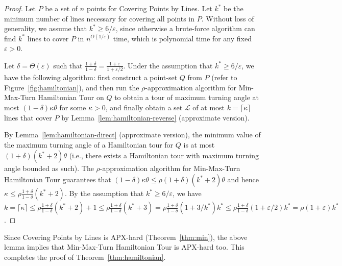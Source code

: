 \documentclass[letterpaper,11pt]{article}
\def\ie{{i.e.}}
\def\L{{\mathcal L}}
\newcommand{\eps}{\varepsilon}
\begin{document}
\begin{proof}
Let $P$ be a set of $n$ points for {\sc Covering Points by Lines}.
Let $k^*$ be the minimum number of lines
necessary for covering all points in $P$.
Without loss of generality, we assume that $k^* \ge 6/\eps$, since otherwise
a brute-force algorithm can find $k^*$ lines to cover $P$
in $n^{O(1/\eps)}$ time, which is polynomial time for any fixed $\eps > 0$.

Let $\delta = \Theta(\eps)$ such that
$\frac{1+\delta}{1-\delta} = \frac{1+\eps}{1+\eps/2}$.
Under the assumption that $k^* \ge 6/\eps$, we have the following algorithm:
first construct a point-set $Q$ from $P$ (refer to Figure~\ref{fig:hamiltonian}),
and then run the $\rho$-approximation algorithm for {\sc Min-Max-Turn Hamiltonian Tour}
on $Q$ to obtain a tour of maximum turning angle at most
$(1-\delta)\kappa\theta$ for some $\kappa>0$,
and finally obtain a set $\L$ of at most $k = \lceil \kappa \rceil$ lines 
that cover $P$ by Lemma~\ref{lem:hamiltonian-reverse} (approximate version).

By Lemma~\ref{lem:hamiltonian-direct} (approximate version),
the minimum value of the maximum turning angle of a Hamiltonian tour
for $Q$ is at most $(1+\delta)(k^* + 2)\theta$
(\ie, there exists a Hamiltonian tour with maximum turning angle
bounded as such). 
The $\rho$-approximation algorithm for {\sc Min-Max-Turn Hamiltonian Tour}
guarantees that
$(1-\delta)\kappa\theta \le \rho(1+\delta)(k^* + 2)\theta$
and hence
$\kappa \le \rho\frac{1+\delta}{1-\delta}(k^* + 2)$.
By the assumption that $k^* \ge 6/\eps$,
we have 
$k = \lceil \kappa \rceil \le \rho\frac{1+\delta}{1-\delta}(k^* + 2) +
1 \le \rho\frac{1+\delta}{1-\delta}(k^* + 3) 
= \rho\frac{1+\delta}{1-\delta}(1 + 3/k^*) k^* \le
\rho\frac{1+\delta}{1-\delta}(1+\eps/2) k^* 
= \rho (1+\eps) k^*$.
\end{proof}

Since {\sc Covering Points by Lines} is APX-hard (Theorem~\ref{thm:min}),
the above lemma implies that {\sc Min-Max-Turn Hamiltonian Tour} is APX-hard too.
This completes the proof of Theorem~\ref{thm:hamiltonian}.
\end{document}
